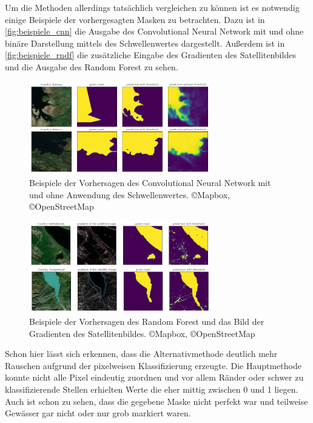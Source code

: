 Um die Methoden allerdings tatsächlich vergleichen zu können ist es notwendig einige Beispiele der vorhergesagten Masken zu betrachten.
Dazu ist in \autoref{fig:beispiele_cnn} die Ausgabe des Convolutional Neural Network mit und ohne binäre Darstellung mittels des Schwellenwertes dargestellt.
Außerdem ist in \autoref{fig:beispiele_rndf} die zusätzliche Eingabe des Gradienten des Satellitenbildes und die Ausgabe des Random Forest zu sehen.

\begin{figure}
    \centering
    \includegraphics[width=0.7\textwidth]{images/bsp_cnn.png}
    \caption{Beispiele der Vorhersagen des Convolutional Neural Network mit und ohne Anwendung des Schwellenwertes. %
    \copyright Mapbox, \copyright OpenStreetMap}
    \label{fig:beispiele_cnn}
\end{figure}

\begin{figure}
    \centering
    \includegraphics[width=0.7\textwidth]{images/bsp_rndf.png}
    \caption{Beispiele der Vorhersagen des Random Forest und  %
    das Bild der Gradienten des Satellitenbildes. %
    \copyright Mapbox, \copyright OpenStreetMap}
    \label{fig:beispiele_rndf}
\end{figure}

Schon hier lässt sich erkennen, dass die Alternativmethode deutlich mehr Rauschen aufgrund der pixelweisen Klassifizierung erzeugte.
Die Hauptmethode konnte nicht alle Pixel eindeutig zuordnen und vor allem Ränder oder schwer zu klassifizierende Stellen erhielten Werte die eher mittig zwischen 0 und 1 liegen.
Auch ist schon zu sehen, dass die gegebene Maske nicht perfekt war und teilweise Gewässer gar nicht oder nur grob markiert waren.


